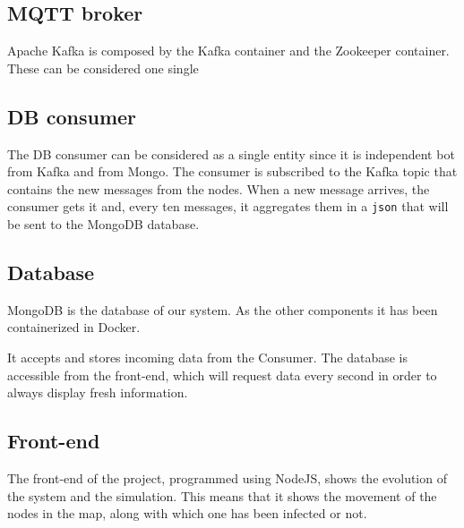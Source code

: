 \documentclass[conference]{IEEEtran}
\begin{document}
	\subsection{MQTT broker}	
	
		Apache Kafka is composed by the Kafka container and the Zookeeper container.
		These can be considered one single 
	
	\subsection{DB consumer}
	
		The DB consumer can be considered as a single entity since it is independent bot from Kafka and from Mongo.
		The consumer is subscribed to the Kafka topic that contains the new messages from the nodes.
		When a new message arrives, the consumer gets it and, every ten messages, it aggregates them in a \texttt{json} that will be sent to the MongoDB database.
	
	\subsection{Database}
	
		MongoDB is the database of our system.
		As the other components it has been containerized in Docker.
		
		It accepts and stores incoming data from the Consumer.
		The database is accessible from the front-end, which will request data every second in order to always display fresh information.
	
	
	\subsection{Front-end}
	
		The front-end of the project, programmed using NodeJS, shows the evolution of the system and the simulation.
		This means that it shows the movement of the nodes in the map, along with which one has been infected or not.
		
\end{document}
